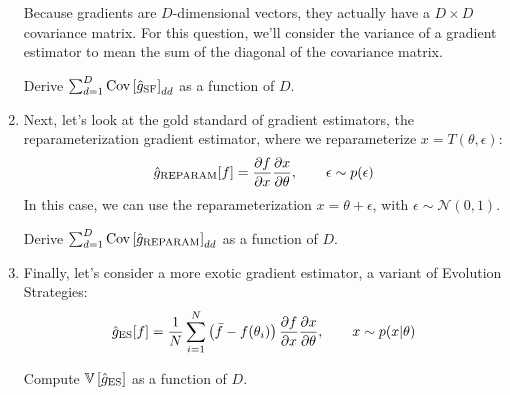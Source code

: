 \documentclass{harvardml}
\newcommand{\cov}{\text{Cov}}
\newcommand{\distNorm}{\mathcal{N}}
\newcommand{\var}{\mathbb{V}}
\theoremstyle{plain}
\begin{document}
\begin{problem}
\begin{enumerate}[label=(\alph*)]
Because gradients are $D$-dimensional vectors, they actually have a $D \times D$ covariance matrix.
For this question, we'll consider the variance of a gradient estimator to mean the sum of the diagonal of the covariance matrix.

Derive $\sum_{d=1}^D \cov \left[ \hat g_\textnormal{SF} \right]_{dd}$ as a function of $D$.
\item Next, let's look at the gold standard of gradient estimators, the reparameterization gradient estimator, where we reparameterize $x = T(\theta, \epsilon)$:
%
\begin{align}
\hat g_\textnormal{REPARAM}[f] = \frac{\partial f}{\partial x} \frac{\partial x}{\partial \theta}, \qquad \epsilon \sim p(\epsilon)
\end{align}
%
In this case, we can use the reparameterization $x = \theta + \epsilon$, with $\epsilon \sim \distNorm(0, 1)$.

Derive $\sum_{d=1}^D \cov \left[ \hat g_\textnormal{REPARAM} \right]_{dd}$ as a function of $D$.

\item Finally, let's consider a more exotic gradient estimator, a variant of Evolution Strategies:
%
\begin{align}
\hat g_\textnormal{ES}[f] = \frac{1}{N} \sum_{i=1}^N \left( \bar f - f(\theta_i) \right)\frac{\partial f}{\partial x} \frac{\partial x}{\partial \theta}, \qquad x \sim p(x|\theta)
\end{align}
%

Compute $\var \left[ \hat g_\textnormal{ES} \right]$ as a function of $D$.
\end{enumerate}
\end{problem}



\end{document}
